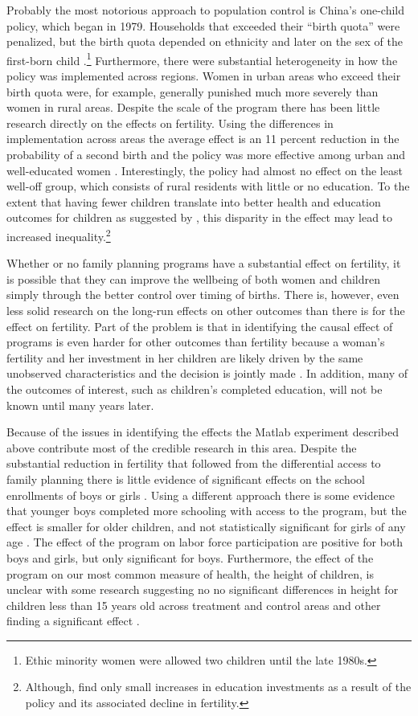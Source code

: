 \documentclass[]{article}
\begin{document}
Probably the most notorious approach to population control is China's one-child policy, which began in 1979. Households that exceeded their ``birth quota'' were penalized, but the birth quota depended on ethnicity and later on the sex of the first-born child \citep{Li2005}.\footnote{Ethic minority women were allowed two children until the late 1980s.} Furthermore, there were substantial heterogeneity in how the policy was implemented across regions. Women in urban areas who exceed their birth quota were, for example, generally punished much more severely than women in rural areas. Despite the scale of the program there has been little research directly on the effects on fertility. Using the differences in implementation across areas the average effect is an 11 percent reduction in the probability of a second birth and the policy was more effective among urban and well-educated women \citep{Li2005}. Interestingly, the policy had almost no eﬀect on the least well-oﬀ group, which consists of rural residents with little or no education. To the extent that having fewer children translate into better health and education outcomes for children as suggested by \citet{becker73}, this disparity in the effect may lead to increased inequality.\footnote{Although, \citet{Rosenzweig2009} find only small increases in education investments as a result of the policy and its associated decline in fertility.}

Whether or no family planning programs have a substantial effect on fertility, it is possible that they can improve the wellbeing of both women and children simply through the better control over timing of births. There is, however, even less solid research on the long-run effects on other outcomes than there is for the effect on fertility. Part of the problem is that in identifying the causal effect of programs is even harder for other outcomes than fertility because a woman's fertility and her investment in her children are likely driven by the same unobserved characteristics and the decision is jointly made \citep{Schultz2005}. In addition, many of the outcomes of interest, such as children's completed education, will not be known until many years later.

Because of the issues in identifying the effects the Matlab experiment described above contribute most of the credible research in this area. Despite the substantial reduction in fertility that followed from the differential access to family planning there is little evidence of significant effects on the school enrollments of boys or girls \citep{Sinha2005}. Using a different approach there is some evidence that younger boys completed more schooling with access to the program, but the effect is smaller for older children, and not statistically significant for girls of any age \citep{Joshi2007}. The effect of the program on labor force participation are positive for both boys and girls, but only signiﬁcant for boys. Furthermore, the effect of the program on our most common measure of health, the height of children, is unclear with some research suggesting no no significant differences in height for children less than 15 years old across treatment and control areas \citep{Joshi2007} and other finding a significant effect \citep{Barham2012}.
\end{document}
